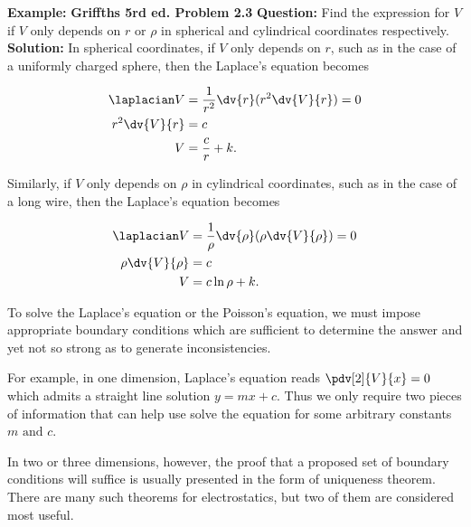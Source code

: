 \documentclass[a4paper,12pt]{report}
\begin{document}
	\begin{example_template}
		\textbf{Example:} \textbf{Griffths 5rd ed. Problem 2.3} \newline \newline
		\textbf{Question:} Find the expression for \(V\) if \(V\) only depends on  \(r \text { or }  \rho \) in spherical and cylindrical coordinates respectively.	
		\newline \newline
		\textbf{Solution:}  In spherical coordinates, if \(V\) only depends on \(r\), such as in the case of a uniformly charged sphere, then the Laplace's equation becomes
		
		\begin{equation}
			\begin{aligned}
				\laplacian V &= \frac{1}{r^2}\dv{r} (r^2 \dv{V}{r} ) = 0 \\ 
				r^2 \dv{V}{r} &= c \\
				V &= \frac{c}{r} + k . 
			\end{aligned}
		\end{equation}
		
		Similarly, if \(V\) only depends on \(\rho \) in cylindrical coordinates, such as in the case of a long wire, then the Laplace's equation becomes 
		
		\begin{equation}
			\begin{aligned}
				\laplacian V &= \frac{1}{\rho } \dv{\rho } (\rho  \dv{V}{\rho }) = 0 \\
				\rho \dv{V}{\rho } &= c \\
				V &= c \ln \rho + k.
			\end{aligned}	
		\end{equation}
		
	\end{example_template}
	
	To solve the Laplace's equation or the Poisson's equation, we must impose appropriate boundary conditions which are sufficient to determine the answer and yet not so strong as to generate inconsistencies. 
	
	For example, in one dimension, Laplace's equation reads \(\pdv[2]{V}{x} = 0\) which admits a straight line solution \(y = mx + c\). Thus we only require two pieces of information that can help use solve the equation for some arbitrary constants \(m \text{ and } c\).
	
	In two or three dimensions, however, the proof that a proposed set of boundary conditions will suffice is usually presented in the form of uniqueness theorem. There are many such theorems for electrostatics, but two of them are considered most useful. 
	
\end{document}
